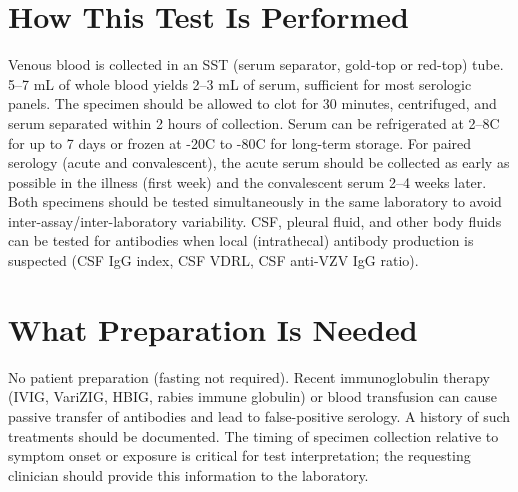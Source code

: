 \section*{How This Test Is Performed}
Venous blood is collected in an SST (serum separator, gold-top or red-top) tube. 5--7 mL of whole blood yields 2--3 mL of serum, sufficient for most serologic panels. The specimen should be allowed to clot for 30 minutes, centrifuged, and serum separated within 2 hours of collection. Serum can be refrigerated at 2--8\textdegree{}C for up to 7 days or frozen at -20\textdegree{}C to -80\textdegree{}C for long-term storage. For paired serology (acute and convalescent), the acute serum should be collected as early as possible in the illness (first week) and the convalescent serum 2--4 weeks later. Both specimens should be tested simultaneously in the same laboratory to avoid inter-assay/inter-laboratory variability. CSF, pleural fluid, and other body fluids can be tested for antibodies when local (intrathecal) antibody production is suspected (CSF IgG index, CSF VDRL, CSF anti-VZV IgG ratio).

\section*{What Preparation Is Needed}
No patient preparation (fasting not required). Recent immunoglobulin therapy (IVIG, VariZIG, HBIG, rabies immune globulin) or blood transfusion can cause passive transfer of antibodies and lead to false-positive serology. A history of such treatments should be documented. The timing of specimen collection relative to symptom onset or exposure is critical for test interpretation; the requesting clinician should provide this information to the laboratory.

